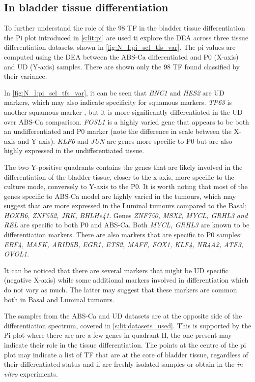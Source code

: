 \subsection{In bladder tissue differentiation} \label{s:N:sel_tf_diff_status}


To further understand the role of the 98 TF in the bladder tissue differentiation the Pi plot introduced in \cref{s:lit:pi} are used ti explore the \gls{DEA} across three tissue differentiation datasets, shown in \cref{fig:N_I:pi_sel_tfs_var}. The pi values are computed using the DEA between the ABS-Ca differentiated and P0 (X-axis) and UD (Y-axis) samples. There are shown only the 98 TF found classified by their variance.

In \cref{fig:N_I:pi_sel_tfs_var}, it can be seen that \textit{BNC1} and \textit{HES2} are UD markers, which may also indicate specificity for squamous markers. \textit{TP63} is another squamous marker \citep{Robertson2017-mg}, but it is more significantly differentiated in the UD over ABS-Ca comparison. \textit{FOSL1} is a highly varied gene that appears to be both an undifferentiated and P0 marker (note the difference in scale between the X-axis and Y-axis). \textit{KLF6} and \textit{JUN} are genes more specific to P0 but are also highly expressed in the undifferentiated tissue.

The two Y-positive quadrants contains the genes that are likely involved in the differentiation of the bladder tissue, closer to the x-axis, more specific to the culture mode, conversely to Y-axis to the P0. It is worth noting that most of the genes specific to ABS-Ca model are highly varied in the tumours, which may suggest that are more expressed in the Luminal tumours compared to the Basal; \textit{HOXB6, ZNF552, JRK, BHLHe41}. Genes \textit{ZNF750, MSX2, MYCL, GRHL3 and REL} are specific to both P0 and ABS-Ca. Both \textit{MYCL, GRHL3} are known to be differentiation markers. There are also markers that are specific to P0 samples: \textit{EBF4, MAFK, ARID5B, EGR1, ETS2, MAFF, FOX1, KLF4, NR4A2, ATF3, OVOL1}. 

It can be noticed that there are several markers that might be UD specific (negative X-axis) while some additional markers involved in differentiation which do not vary as much. The latter may suggest that these markers are common both in Basal and Luminal tumours. 

The samples from the ABS-Ca and UD datasets are at the opposite side of the differentiation spectrum, covered in \cref{s:lit:datasets_used}. This is supported by the Pi plot where there are are a few genes in quadrant II, the one present may indicate their role in the tissue differentiation. The points at the centre of the pi plot may indicate a list of TF that are at the core of bladder tissue, regardless of their differentiated status and if are freshly isolated samples or obtain in the \textit{in-vitro} experiments.


